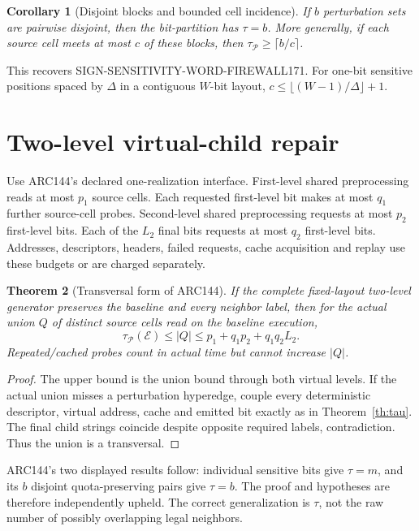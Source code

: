 \documentclass[11pt]{article}
\newtheorem{theorem}{Theorem}
\newtheorem{corollary}[theorem]{Corollary}
\begin{document}
\begin{corollary}[Disjoint blocks and bounded cell incidence]
If $b$ perturbation sets are pairwise disjoint, then the bit-partition has
$\tau=b$.  More generally, if each source cell meets at most $c$ of these
blocks, then $\tau_{\mathcal P}\ge\lceil b/c\rceil$.
\end{corollary}
This recovers SIGN-SENSITIVITY-WORD-FIREWALL171.  For one-bit sensitive
positions spaced by $\Delta$ in a contiguous $W$-bit layout,
$c\le\lfloor(W-1)/\Delta\rfloor+1$.

\section{Two-level virtual-child repair}
Use ARC144's declared one-realization interface.  First-level shared
preprocessing reads at most $p_1$ source cells.  Each requested first-level
bit makes at most $q_1$ further source-cell probes.  Second-level shared
preprocessing requests at most $p_2$ first-level bits.  Each of the $L_2$
final bits requests at most $q_2$ first-level bits.  Addresses, descriptors,
headers, failed requests, cache acquisition and replay use these budgets or
are charged separately.

\begin{theorem}[Transversal form of ARC144]\label{th:two}
If the complete fixed-layout two-level generator preserves the baseline and
every neighbor label, then for the actual union $Q$ of distinct source cells
read on the baseline execution,
\[
 \boxed{\tau_{\mathcal P}(\mathcal E)\le |Q|
 \le p_1+q_1p_2+q_1q_2L_2.}
\]
Repeated/cached probes count in actual time but cannot increase $|Q|$.
\end{theorem}
\begin{proof}
The upper bound is the union bound through both virtual levels.  If the
actual union misses a perturbation hyperedge, couple every deterministic
descriptor, virtual address, cache and emitted bit exactly as in
Theorem~\ref{th:tau}.  The final child strings coincide despite opposite
required labels, contradiction.  Thus the union is a transversal.
\end{proof}

ARC144's two displayed results follow: individual sensitive bits give
$\tau=m$, and its $b$ disjoint quota-preserving pairs give $\tau=b$.  The
proof and hypotheses are therefore independently upheld.  The correct
generalization is $\tau$, not the raw number of possibly overlapping legal
neighbors.
\end{document}
